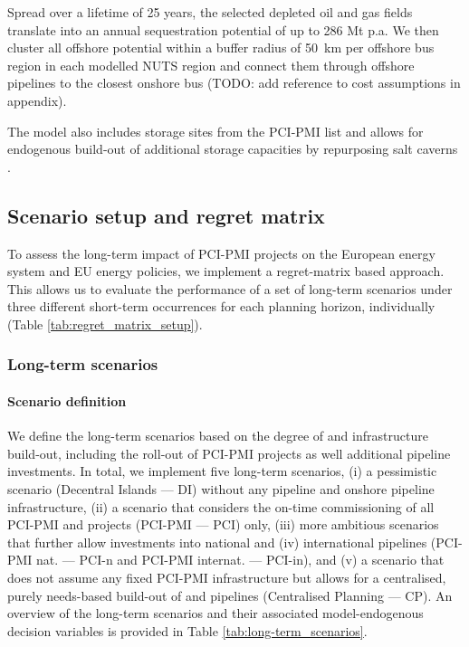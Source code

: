 \documentclass[preprint,12pt,sort&compress]{elsarticle}
\begin{document}
Spread over a lifetime of 25 years, the selected depleted oil and gas fields translate into an annual sequestration potential of up to 286 Mt p.a. We then cluster all offshore potential within a buffer radius of \SI{50}{km} per offshore bus region in each modelled NUTS region and connect them through offshore  pipelines to the closest onshore bus (TODO: add reference to cost assumptions in appendix).

The model also includes  storage sites from the PCI-PMI list and allows for endogenous build-out of additional storage capacities by repurposing salt caverns \cite{neumannPotentialRoleHydrogen2023}.

\subsection{Scenario setup and regret matrix}
\label{sec:scenario_setup}
To assess the long-term impact of PCI-PMI projects on the European energy system and EU energy policies, we implement a regret-matrix based approach. This allows us to evaluate the performance of a set of long-term scenarios under three different short-term occurrences for each planning horizon, individually (Table \ref{tab:regret_matrix_setup}).

\subsubsection{Long-term scenarios}
\paragraph{Scenario definition}
\label{sec:definition}
We define the long-term scenarios based on the degree of  and  infrastructure build-out, including the roll-out of PCI-PMI projects as well additional pipeline investments. In total, we implement five long-term scenarios, (i) a pessimistic scenario (Decentral Islands --- DI) without any  pipeline and onshore  pipeline infrastructure, (ii) a scenario that considers the on-time commissioning of all PCI-PMI  and  projects (PCI-PMI --- PCI) only, (iii) more ambitious scenarios that further allow investments into national and (iv) international pipelines (PCI-PMI nat. --- PCI-n and PCI-PMI internat. --- PCI-in), and (v) a scenario that does not assume any fixed PCI-PMI infrastructure but allows for a centralised, purely needs-based build-out of  and  pipelines (Centralised Planning --- CP). An overview of the long-term scenarios and their associated model-endogenous decision variables is provided in Table \ref{tab:long-term_scenarios}. 
\end{document}
